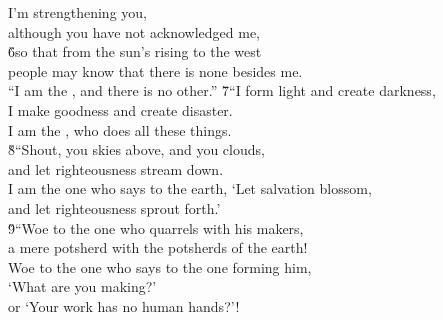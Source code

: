 \begin{poetry}
\poeml I'm strengthening you, \\
\poemll    although you have not acknowledged me, \\
\poeml \v{6}so that from the sun's rising to the west \\
\poemll    people may know that there is none besides me. \\
\poeml ``I am the , and there is no other.''
\poeml \v{7}``I form light and create darkness, \\
\poeml I make goodness and create disaster. \\
\poemll    I am the , who does all these things. \\
\poeml \v{8}``Shout, you skies above, and you clouds, \\
\poemll    and let righteousness stream down. \\
\poeml I am the one who says to the earth, `Let salvation blossom, \\
\poemll    and let righteousness sprout forth.' \\
\poeml \v{9}``Woe to the one who quarrels with his makers, \\
\poemll    a mere potsherd with the potsherds of the earth! \\
\poeml Woe to the one who says to the one forming him, \\
\poemll    `What are you making?' \\
\poemlll       or `Your work has no human hands?'! \\

\end{poetry}
